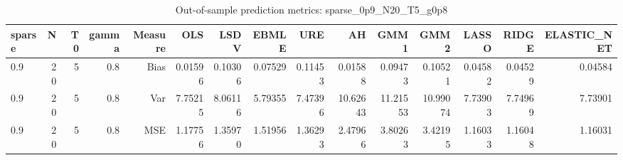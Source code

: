 \begin{table}[!htbp]\centering
\caption{Out-of-sample prediction metrics: sparse_0p9_N20_T5_g0p8}
\label{tab:table3_sparse_0p9_N20_T5_g0p8}
\begin{tabular}{lrrrrrrrrrrrrrr}
\hline
sparse & N & T0 & gamma & Measure & OLS & LSDV & EBMLE & URE & AH & GMM1 & GMM2 & LASSO & RIDGE & ELASTIC_NET \\
\hline
0.9 & 20 & 5 & 0.8 & Bias & 0.01596 & 0.10306 & 0.07529 & 0.11453 & 0.01588 & 0.09473 & 0.10521 & 0.04582 & 0.04529 & 0.04584 \\
0.9 & 20 & 5 & 0.8 & Var & 7.75215 & 8.06116 & 5.79355 & 7.47396 & 10.62643 & 11.21553 & 10.99074 & 7.73903 & 7.74969 & 7.73901 \\
0.9 & 20 & 5 & 0.8 & MSE & 1.17756 & 1.35970 & 1.51956 & 1.36293 & 2.47966 & 3.80263 & 3.42195 & 1.16033 & 1.16048 & 1.16031 \\
\hline
\end{tabular}
\end{table}

